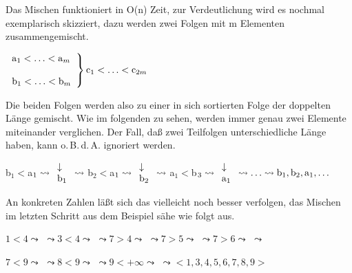 \documentclass[ngerman,draft,parskip=half*,twoside]{scrreprt}
\theoremstyle{break}
\begin{document}
Das Mischen funktioniert in O(n) Zeit, zur Verdeutlichung wird es nochmal exemplarisch skizziert, dazu werden zwei Folgen mit m
Elementen zusammengemischt.

$\left. 
\begin{array}{l}
{\textrm{\textup{a}}}_1<\ldots<{\textrm{\textup{a}}}_m\\
\phantom{leer}\\
{\textrm{\textup{b}}}_1<\ldots<{\textrm{\textup{b}}}_m
\end{array}
\right\} {\textrm{\textup{c}}}_1<\ldots<{\textrm{\textup{c}}}_{2m}$
\bigskip

Die beiden Folgen werden also zu einer in sich sortierten Folge der doppelten Länge gemischt. Wie im folgenden zu sehen, werden immer genau
zwei Elemente miteinander verglichen. Der Fall, daß zwei Teilfolgen unterschiedliche Länge haben, kann o.\,B.\,d.\,A. ignoriert werden.
\bigskip

b$_1<$a$_1 \leadsto \begin{array}{l}
\downarrow\\
{\textrm{\textup{b}}}_1
\end{array} \leadsto$
b$_2<$a$_1 \leadsto \begin{array}{l}
\downarrow\\
{\textrm{\textup{b}}}_2
\end{array} \leadsto$
a$_1<$b$_3 \leadsto \begin{array}{l}
\downarrow\\
{\textrm{\textup{a}}}_1
\end{array} \leadsto \ldots \leadsto {\textrm{\textup{b}}}_1, {\textrm{\textup{b}}}_2, {\textrm{\textup{a}}}_1, \ldots$
\bigskip

An konkreten Zahlen läßt sich das vielleicht noch besser verfolgen, das Mischen im letzten Schritt aus dem Beispiel sähe wie folgt aus.
\bigskip

$1<4 \leadsto$  $\leadsto
3<4 \leadsto$  $\leadsto
7>4 \leadsto$  $\leadsto 
7>5 \leadsto$  $\leadsto
7>6 \leadsto$  $\leadsto$
\medskip

$7<9 \leadsto$  $\leadsto
8<9 \leadsto$  $\leadsto
9<+\infty \leadsto$  $
\leadsto<1,3,4,5,6,7,8,9>$
\medskip
\end{document}
